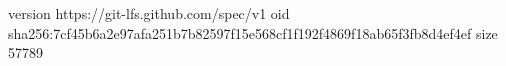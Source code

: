 version https://git-lfs.github.com/spec/v1
oid sha256:7cf45b6a2e97afa251b7b82597f15e568cf1f192f4869f18ab65f3fb8d4ef4ef
size 57789
